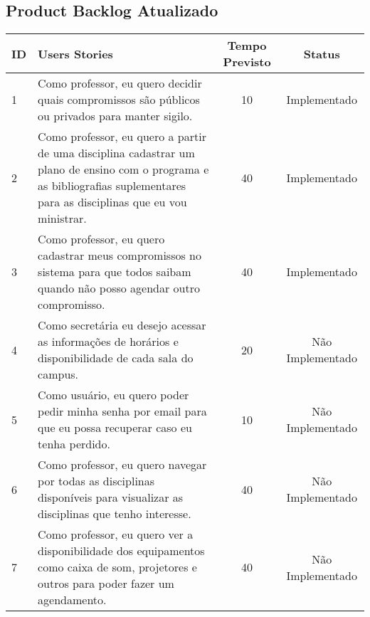 \setlength{\arrayrulewidth}{1.5pt}
\begin{landscape}
	\chapter{Product Backlog Atualizado}
		\begin{longtable}{|p{0.5in}|p{6in}|c|c|}
		
		\hline
		  {\bf ID} & {\bf Users Stories} & {\bf Tempo Previsto} & {\bf Status} \\
	
		\hline \rowcolor{cImplementado}
		         1 & Como professor, eu quero decidir quais compromissos são públicos ou privados para manter sigilo. &         10 & Implementado \\
		
		\hline \rowcolor{cImplementado}
		         2 & Como professor, eu quero a partir de uma disciplina cadastrar um plano de ensino com o programa e as bibliografias suplementares para as disciplinas que eu vou ministrar. &         40 & Implementado \\
		
		\hline \rowcolor{cImplementado}
		         3 & Como professor, eu quero cadastrar meus compromissos no sistema para que todos saibam quando não posso agendar outro compromisso. &         40 & Implementado \\
		\hline \rowcolor{cNaoImplementado}
		         4 & Como secretária eu desejo acessar as informações de horários e disponibilidade de cada sala do campus.  &         20 & Não Implementado \\
		
		\hline  \rowcolor{cNaoImplementado}
		         5 & Como usuário, eu quero poder pedir minha senha por email para que eu possa recuperar caso eu tenha perdido. &         10 & Não Implementado \\
		
		\hline \rowcolor{cNaoImplementado}
		         6 & Como professor, eu quero navegar por todas as disciplinas disponíveis para visualizar as disciplinas que tenho interesse.  &         40 & Não Implementado \\
		
		\hline \rowcolor{cNaoImplementado}
		         7 & Como professor, eu quero ver a disponibilidade dos equipamentos como caixa de som, projetores e outros para poder fazer um agendamento. &         40 & Não Implementado \\
		

\end{longtable}
\end{landscape}
